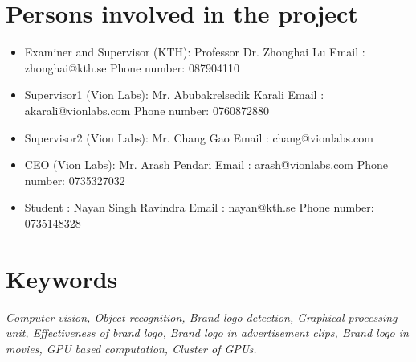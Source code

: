 \section{Persons involved in the project}
\begin{itemize}
\item Examiner and Supervisor (KTH): Professor Dr. Zhonghai Lu
\subitem Email : zhonghai@kth.se
\subitem Phone number: 087904110
\item Supervisor1 (Vion Labs): Mr. Abubakrelsedik Karali 
\subitem Email : akarali@vionlabs.com 
\subitem Phone number: 0760872880
\item Supervisor2 (Vion Labs): Mr. Chang Gao
\subitem Email : chang@vionlabs.com
\item CEO (Vion Labs): Mr. Arash Pendari
\subitem Email : arash@vionlabs.com 
\subitem Phone number: 0735327032
\item Student : Nayan Singh Ravindra
\subitem Email : nayan@kth.se
\subitem Phone number: 0735148328
\end{itemize}


\section{Keywords}
{\it Computer vision, Object recognition, Brand logo detection, Graphical processing unit, Effectiveness of brand logo, Brand logo in advertisement clips, Brand logo in movies, GPU based computation, Cluster of GPUs.}
  
